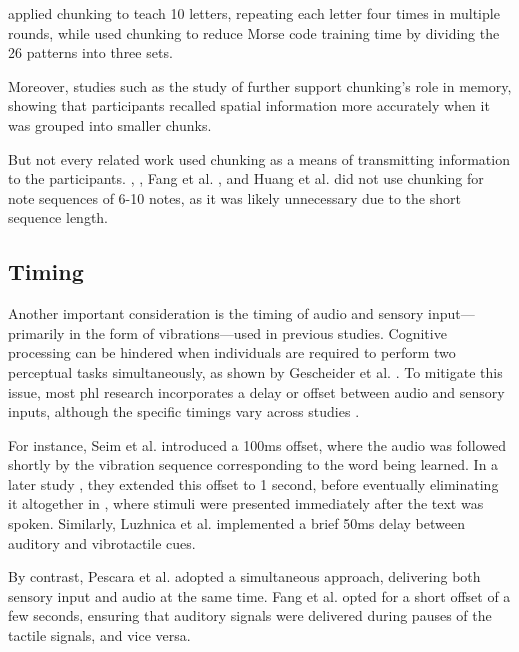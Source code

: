  applied chunking to teach 10 letters, repeating each letter four times in multiple rounds, while  used chunking to reduce Morse code training time by dividing the 26 patterns into three sets.

Moreover, studies such as the study of  further support chunking’s role in memory, showing that participants recalled spatial information more accurately when it was grouped into smaller chunks.

But not every related work used chunking as a means of transmitting information to the participants. , , Fang et al. \cite{Fang2023a, Fang2023}, and Huang et al. \cite{Huang2008} did not use chunking for note sequences of 6-10 notes, as it was likely unnecessary due to the short sequence length.


\subsection*{Timing}
Another important consideration is the timing of audio and sensory input—primarily in the form of vibrations—used in previous studies. Cognitive processing can be hindered when individuals are required to perform two perceptual tasks simultaneously, as shown by Gescheider et al. \cite{Gescheider1975}. To mitigate this issue, most \gls{phl} research incorporates a delay or offset between audio and sensory inputs, although the specific timings vary across studies \cite{Seim2014, Seim2017, Luzhnica2018, Fang2023a}.

For instance, Seim et al. \cite{Seim2014} introduced a 100ms offset, where the audio was followed shortly by the vibration sequence corresponding to the word being learned. In a later study \cite{Seim2016}, they extended this offset to 1 second, before eventually eliminating it altogether in \cite{Seim2017}, where stimuli were presented immediately after the text was spoken. Similarly, Luzhnica et al. \cite{Luzhnica2018} implemented a brief 50ms delay between auditory and vibrotactile cues.

By contrast, Pescara et al. \cite{Pescara2019} adopted a simultaneous approach, delivering both sensory input and audio at the same time. Fang et al. \cite{Fang2023a} opted for a short offset of a few seconds, ensuring that auditory signals were delivered during pauses of the tactile signals, and vice versa.





